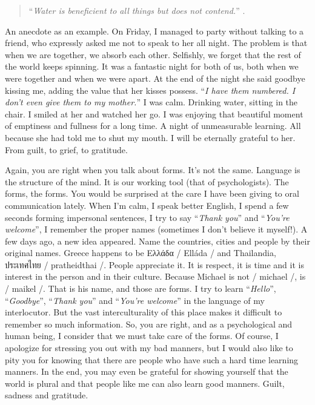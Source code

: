 \documentclass[]{book}
\begin{document}
\begin{quote}
``\emph{Water is beneficient to all things but does not contend.}'' \citep{ta1984tao}.
\end{quote}

An anecdote as an example. On Friday, I managed to party without talking to a friend, who expressly asked me not to speak to her all night. The problem is that when we are together, we absorb each other. Selfishly, we forget that the rest of the world keeps spinning. It was a fantastic night for both of us, both when we were together and when we were apart.
At the end of the night she said goodbye kissing me, adding the value that her kisses possess. ``\emph{I have them numbered. I don't even give them to my mother.}'' I was calm. Drinking water, sitting in the chair. I smiled at her and watched her go. I was enjoying that beautiful moment of emptiness and fullness for a long time. A night of unmeasurable learning. All because she had told me to shut my mouth. I will be eternally grateful to her. From guilt, to grief, to gratitude.

Again, you are right when you talk about forms. It's not the same. Language is the structure of the mind. It is our working tool (that of psychologists). The forms, the forms. You would be surprised at the care I have been giving to oral communication lately. When I'm calm, I speak better English, I spend a few seconds forming impersonal sentences, I try to say ``\emph{Thank you}'' and ``\emph{You're welcome}'', I remember the proper names (sometimes I don't believe it myself!). A few days ago, a new idea appeared. Name the countries, cities and people by their original names. Greece happens to be Ελλάδα / Elláda / and Thailandia, ประเทศไทย / pratheidthai /. People appreciate it. It is respect, it is time and it is interest in the person and in their culture. Because Michael is not / michael /, is / maikel /. That is his name, and those are forms. I try to learn ``\emph{Hello}'', ``\emph{Goodbye}'', ``\emph{Thank you}'' and ``\emph{You're welcome}'' in the language of my interlocutor. But the vast interculturality of this place makes it difficult to remember so much information. So, you are right, and as a psychological and human being, I consider that we must take care of the forms. Of course, I apologize for stressing you out with my bad manners, but I would also like to pity you for knowing that there are people who have such a hard time learning manners. In the end, you may even be grateful for showing yourself that the world is plural and that people like me can also learn good manners. Guilt, sadness and gratitude.
\end{document}
